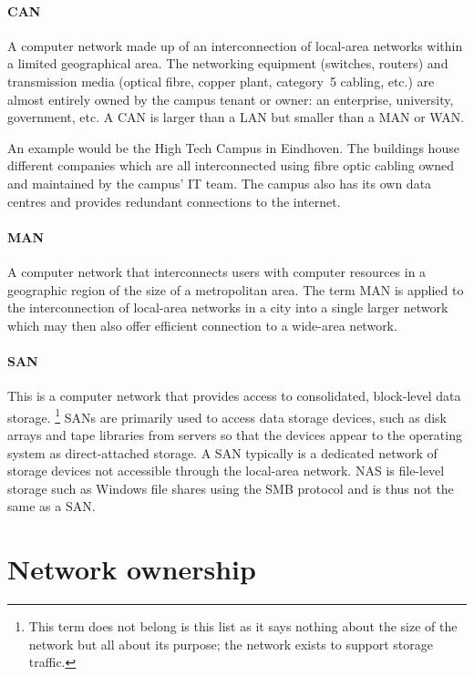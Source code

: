 \paragraph{\gls{CAN}}
A computer network made up of an interconnection of local-area networks within a limited geographical area.
The networking equipment (switches, routers) and transmission media (optical fibre, copper plant, category~5 cabling, etc.) are almost entirely owned by the campus tenant or owner: an enterprise, university, government, etc.
A \acl{CAN} is larger than a \acl{LAN} but smaller than a \acs{MAN} or \gls{WAN}.

An example would be the High Tech Campus in Eindhoven.
The buildings house different companies which are all interconnected using fibre optic cabling owned and maintained by the campus' \acs{IT} team.
The campus also has its own data centres and provides redundant connections to the internet.

\paragraph{\gls{MAN}}%
A computer network that interconnects users with computer resources in a geographic region of the size of a metropolitan area.
The term \gls{MAN} is applied to the interconnection of local-area networks in a city into a single larger network which may then also offer efficient connection to a wide-area network.

\paragraph{\gls{SAN}}%
This is a computer network that provides access to consolidated, block-level data storage.%
   \footnote{This term does not belong is this list as it says nothing about the size of the network but all about its purpose; the network exists to support storage traffic.}
\glspl{SAN} are primarily used to access data storage devices, such as disk arrays and tape libraries from servers so that the devices appear to the operating system as direct-attached storage.
A \gls{SAN} typically is a dedicated network of storage devices not accessible through the local-area network.
\Gls{NAS} is file-level storage such as Windows file shares using the \acs{SMB} protocol and is thus not the same as a \acs{SAN}.




\section{Network ownership}
\label{sec:network-ownership}

